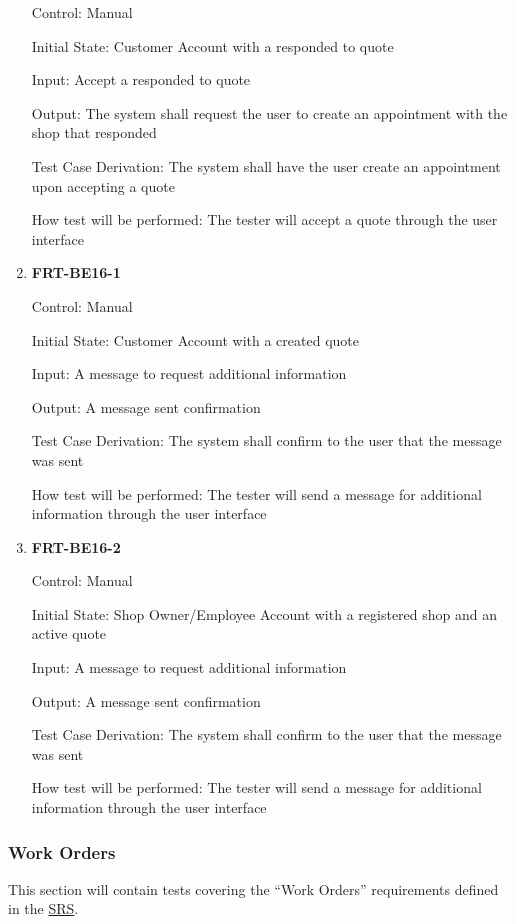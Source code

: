 \documentclass[12pt, titlepage]{article}
\begin{document}
\begin{enumerate}
	      Control: Manual

	      Initial State: Customer Account with a responded to quote

	      Input: Accept a responded to quote

	      Output: The system shall request the user to create an appointment with the shop that responded

	      Test Case Derivation: The system shall have the user create an appointment upon accepting a quote

	      How test will be performed: The tester will accept a quote through the user interface

	\item \textbf{FRT-BE16-1}

	      Control: Manual

	      Initial State: Customer Account with a created quote

	      Input: A message to request additional information

	      Output: A message sent confirmation

	      Test Case Derivation: The system shall confirm to the user that the message was sent

	      How test will be performed: The tester will send a message for additional information through the
	      user interface

	\item \textbf{FRT-BE16-2}

	      Control: Manual

	      Initial State: Shop Owner/Employee Account with a registered shop and an active quote

	      Input: A message to request additional information

	      Output: A message sent confirmation

	      Test Case Derivation: The system shall confirm to the user that the message was sent

	      How test will be performed: The tester will send a message for additional information through the
	      user interface
\end{enumerate}

\subsubsection{Work Orders}

This section will contain tests covering the ``Work Orders'' requirements defined in the
\href{https://github.com/arkinmodi/project-sayyara/blob/main/docs/SRS/SRS.pdf}{SRS}.
\end{document}
